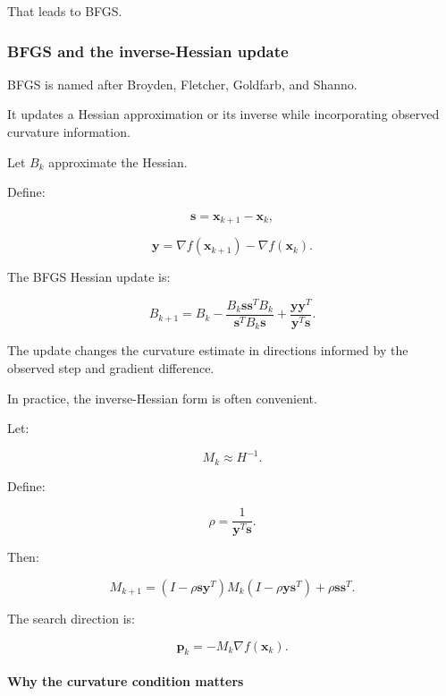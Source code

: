 That leads to BFGS.

\subsubsection{BFGS and the inverse-Hessian update}\label{02-foundations-ii-ch026-bfgs-and-the-inverse-hessian-update}

\hypertarget{02-foundations-ii-ch026-bfgs-and-the-inverse-hessian-update}{}

BFGS is named after Broyden, Fletcher, Goldfarb, and Shanno.

It updates a Hessian approximation or its inverse while incorporating observed curvature information.

Let \(B_k\) approximate the Hessian.

Define:

\[
\mathbf s=\mathbf x_{k+1}-\mathbf x_k,
\]

\[
\mathbf y=\nabla f(\mathbf x_{k+1})-\nabla f(\mathbf x_k).
\]

The BFGS Hessian update is:

\[
\boxed{ B_{k+1} = B_k - \frac{B_k\mathbf s\mathbf s^TB_k} {\mathbf s^TB_k\mathbf s} + \frac{\mathbf y\mathbf y^T} {\mathbf y^T\mathbf s} }.
\]

The update changes the curvature estimate in directions informed by the observed step and gradient difference.

In practice, the inverse-Hessian form is often convenient.

Let:

\[
M_k\approx H^{-1}.
\]

Define:

\[
\rho=\frac1{\mathbf y^T\mathbf s}.
\]

Then:

\[
\boxed{ M_{k+1} = (I-\rho\mathbf s\mathbf y^T) M_k (I-\rho\mathbf y\mathbf s^T) + \rho\mathbf s\mathbf s^T }.
\]

The search direction is:

\[
\boxed{ \mathbf p_k=-M_k\nabla f(\mathbf x_k) }.
\]

\paragraph{Why the curvature condition matters}\label{02-foundations-ii-ch026-why-the-curvature-condition-matters}

\hypertarget{02-foundations-ii-ch026-why-the-curvature-condition-matters}{}

